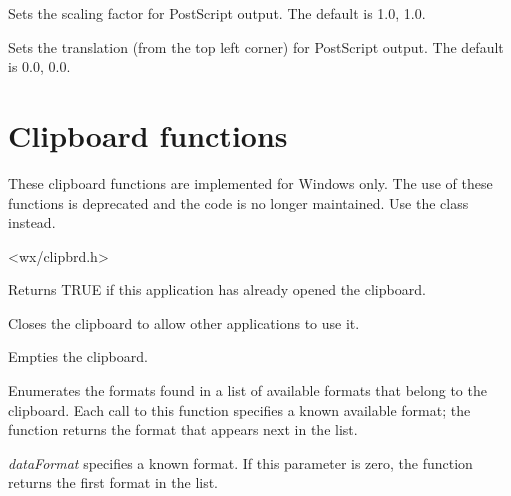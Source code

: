 \label{wxsetprinterscaling}


Sets the scaling factor for PostScript output. The default is 1.0, 1.0.

\label{wxsetprintertranslation}


Sets the translation (from the top left corner) for PostScript output. The default is 0.0, 0.0.

\section{Clipboard functions}\label{clipsboard}

These clipboard functions are implemented for Windows only. The use of these functions
is deprecated and the code is no longer maintained. Use the 
class instead.


<wx/clipbrd.h>

\label{functionwxclipboardopen}


Returns TRUE if this application has already opened the clipboard.

\label{wxcloseclipboard}


Closes the clipboard to allow other applications to use it.

\label{wxemptyclipboard}


Empties the clipboard.

\label{wxenumclipboardformats}


Enumerates the formats found in a list of available formats that belong
to the clipboard. Each call to this  function specifies a known
available format; the function returns the format that appears next in
the list.

{\it dataFormat} specifies a known format. If this parameter is zero,
the function returns the first format in the list.

